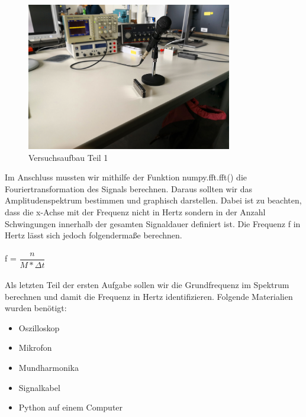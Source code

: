 \documentclass[12pt, oneside, a4paper, \docLanguage]{report}
\begin{document}
\begin{figure}[H]
	\centering\small
	\includegraphics[width=0.8\textwidth]{media/aufbau2.jpg}
	\caption{Versuchsaufbau Teil 1}
	\label{img:Versuchsaufbau Teil 1}
\end{figure}
\newpage
Im Anschluss mussten wir mithilfe der Funktion numpy.fft.fft() die Fouriertransformation des Signals berechnen. Daraus sollten wir das Amplitudenspektrum bestimmen und graphisch darstellen.
\newline 
Dabei ist zu beachten, dass die x-Achse mit der Frequenz nicht in Hertz sondern in der Anzahl Schwingungen innerhalb der gesamten Signaldauer definiert ist.
Die Frequenz f in Hertz lässt sich jedoch folgendermaße berechnen.
\\~\\
f = $\dfrac{n}{M * \Delta t}$
\\~\\
Als letzten Teil der ersten Aufgabe sollen wir die Grundfrequenz im Spektrum berechnen und damit die Frequenz in Hertz identifizieren.
Folgende Materialien wurden benötigt: ~\par
\begin{itemize}
	\item Oszilloskop
	\item Mikrofon
	\item Mundharmonika
	\item Signalkabel
	\item Python auf einem Computer
\end{itemize}
\newpage
\end{document}
